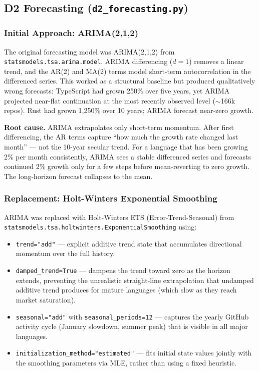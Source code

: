 \documentclass[conference]{IEEEtran}
\begin{document}
\subsection{D2 Forecasting (\texttt{d2\_forecasting.py})}
\label{sec:d2}

\subsubsection{Initial Approach: ARIMA(2,1,2)}

The original forecasting model was ARIMA(2,1,2) from
\texttt{statsmodels.tsa.arima.model}. ARIMA differencing ($d=1$) removes
a linear trend, and the AR(2) and MA(2) terms model short-term autocorrelation
in the differenced series. This worked as a structural baseline but
produced qualitatively wrong forecasts: TypeScript had grown 250\% over
five years, yet ARIMA projected near-flat continuation at the most
recently observed level ($\sim$166k repos). Rust had grown 1,250\% over
10 years; ARIMA forecast near-zero growth.

\textbf{Root cause.} ARIMA extrapolates only short-term momentum. After
first differencing, the AR terms capture ``how much the growth rate
changed last month'' — not the 10-year secular trend. For a language that
has been growing 2\% per month consistently, ARIMA sees a stable differenced
series and forecasts continued 2\% growth only for a few steps before mean-reverting
to zero growth. The long-horizon forecast collapses to the mean.

\subsubsection{Replacement: Holt-Winters Exponential Smoothing}

ARIMA was replaced with Holt-Winters ETS (Error-Trend-Seasonal) from
\texttt{statsmodels.tsa.\allowbreak holtwinters.\allowbreak ExponentialSmoothing} using:

\begin{itemize}
  \item \texttt{trend="add"} — explicit additive trend state that
        accumulates directional momentum over the full history.
  \item \texttt{damped\_trend=True} — dampens the trend toward zero as
        the horizon extends, preventing the unrealistic straight-line
        extrapolation that undamped additive trend produces for mature
        languages (which slow as they reach market saturation).
  \item \texttt{seasonal="add"} with \texttt{seasonal\_periods=12} —
        captures the yearly GitHub activity cycle (January slowdown,
        summer peak) that is visible in all major languages.
  \item \texttt{initialization\_method="estimated"} — fits initial
        state values jointly with the smoothing parameters via MLE,
        rather than using a fixed heuristic.
\end{itemize}
\end{document}
